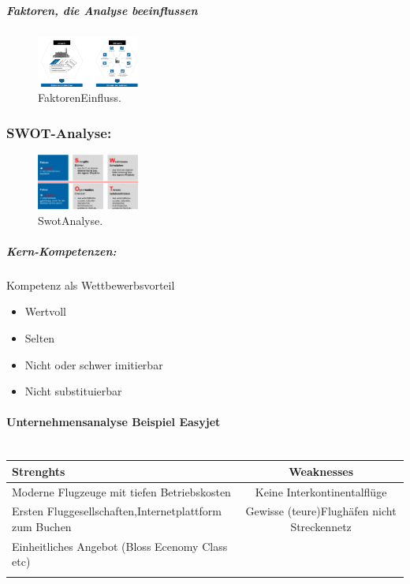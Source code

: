 \documentclass[../ZF_Wing.tex]{subfiles}
\begin{document}
\subparagraph{Faktoren, die Analyse beeinflussen\\}
\begin{figure}[H]
\centering
\includegraphics[width=0.3\textwidth]{Resources/Image/FaktorenEinfluss.png}
\caption{\label{fig:FaktorenEinfluss}FaktorenEinfluss.}
\end{figure}

\subsubsection{SWOT-Analyse:}
\begin{figure}[H]
\centering
\includegraphics[width=0.3\textwidth]{Resources/Image/SwotAnalyse.png}
\caption{\label{fig:SwotAnalyse}SwotAnalyse.}
\end{figure}

\subparagraph{Kern-Kompetenzen:}

Kompetenz als Wettbewerbsvorteil
\begin{itemize}
\item Wertvoll
\item Selten
\item Nicht oder schwer imitierbar
\item Nicht substituierbar
\end{itemize}


\paragraph{Unternehmensanalyse Beispiel Easyjet \\ \\}

\begin{tabular}{|l|c|}
\hline
\rule[-1ex]{0pt}{2.5ex} 
\textbf{Strenghts} & \textbf{Weaknesses} \\ 
\hline 
\rule[-1ex]{0pt}{2.5ex}
Moderne Flugzeuge mit tiefen Betriebskosten & Keine Interkontinentalflüge \\ 
\hline 
\rule[-1ex]{0pt}{2.5ex}
Ersten Fluggesellschaften,Internetplattform zum Buchen & Gewisse (teure)Flughäfen  nicht Streckennetz \\ 
\hline
\rule[-1ex]{0pt}{2.5ex} 
Einheitliches Angebot (Bloss Ecenomy Class etc) &  \\ 
\hline
\rule[-1ex]{0pt}{2.5ex}
\end{tabular} \\ \\
\end{document}
